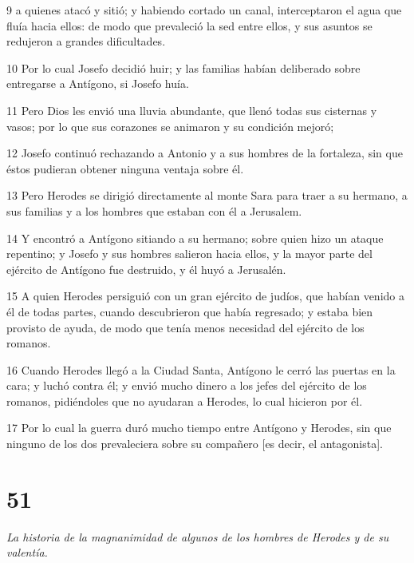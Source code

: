\par 9 a quienes atacó y sitió; y habiendo cortado un canal, interceptaron el agua que fluía hacia ellos: de modo que prevaleció la sed entre ellos, y sus asuntos se redujeron a grandes dificultades.

\par 10 Por lo cual Josefo decidió huir; y las familias habían deliberado sobre entregarse a Antígono, si Josefo huía.

\par 11 Pero Dios les envió una lluvia abundante, que llenó todas sus cisternas y vasos; por lo que sus corazones se animaron y su condición mejoró;

\par 12 Josefo continuó rechazando a Antonio y a sus hombres de la fortaleza, sin que éstos pudieran obtener ninguna ventaja sobre él.

\par 13 Pero Herodes se dirigió directamente al monte Sara para traer a su hermano, a sus familias y a los hombres que estaban con él a Jerusalem.

\par 14 Y encontró a Antígono sitiando a su hermano; sobre quien hizo un ataque repentino; y Josefo y sus hombres salieron hacia ellos, y la mayor parte del ejército de Antígono fue destruido, y él huyó a Jerusalén.

\par 15 A quien Herodes persiguió con un gran ejército de judíos, que habían venido a él de todas partes, cuando descubrieron que había regresado; y estaba bien provisto de ayuda, de modo que tenía menos necesidad del ejército de los romanos.

\par 16 Cuando Herodes llegó a la Ciudad Santa, Antígono le cerró las puertas en la cara; y luchó contra él; y envió mucho dinero a los jefes del ejército de los romanos, pidiéndoles que no ayudaran a Herodes, lo cual hicieron por él.

\par 17 Por lo cual la guerra duró mucho tiempo entre Antígono y Herodes, sin que ninguno de los dos prevaleciera sobre su compañero [es decir, el antagonista].

\chapter{51}

\par \textit{La historia de la magnanimidad de algunos de los hombres de Herodes y de su valentía.}

